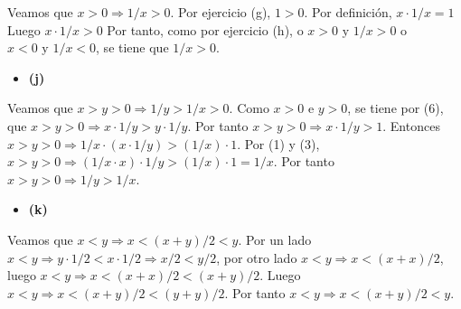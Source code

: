 \documentclass{article}
\begin{document}
Veamos que \(x>0\Rightarrow 1/x>0\). Por ejercicio (g), \(1>0\). Por definición, \(x\cdot 1/x=1\) Luego  \(x\cdot 1/x>0\) Por tanto, como por ejercicio (h), o \(x>0 \text{ y } 1/x>0\) o \(x<0 \text{ y } 1/x<0\), se tiene que \(1/x>0\).
\begin{itemize}
\item \bf (j) \rm 
\end{itemize}
Veamos que \(x>y>0 \Rightarrow 1/y>1/x>0\). Como \(x>0\) e \(y>0\), se tiene por (6), que \(x>y>0 \Rightarrow x\cdot 1/y>y\cdot1/y\). Por tanto \(x>y>0 \Rightarrow x\cdot 1/y>1\). Entonces \(x>y>0 \Rightarrow 1/x\cdot\left(x\cdot 1/y\right)>\left(1/x\right)\cdot 1\). Por (1) y (3), \(x>y>0 \Rightarrow \left(1/x\cdot x\right)\cdot 1/y>\left(1/x\right)\cdot 1=1/x\). Por tanto \(x>y>0 \Rightarrow 1/y>1/x\).
\begin{itemize}
\item \bf (k) \rm 
\end{itemize}
Veamos que \(x<y\Rightarrow x<\left(x+y\right)/2<y\). Por un lado \(x<y\Rightarrow y\cdot1/2<x\cdot1/2\Rightarrow x/2<y/2\), por otro lado \(x<y\Rightarrow x<\left(x+x\right)/2\), luego \(x<y\Rightarrow x<\left(x+x\right)/2<\left(x+y\right)/2\). Luego \(x<y\Rightarrow x<\left(x+y\right)/2<\left(y+y\right)/2\). Por tanto \(x<y\Rightarrow x<\left(x+y\right)/2<y\).  
%
%
\end{document}

